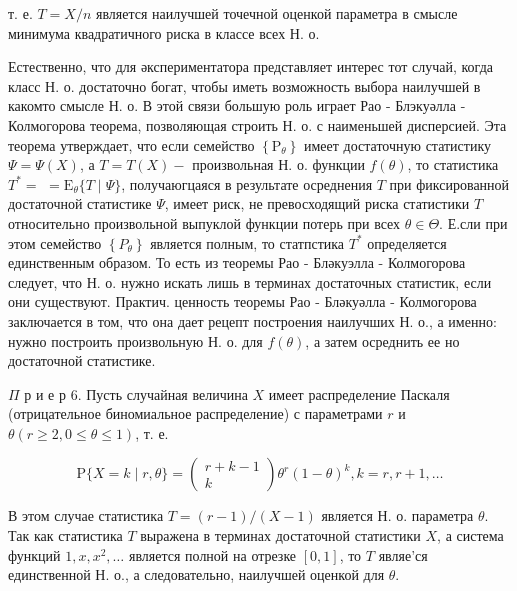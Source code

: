 \documentclass[10pt]{article}
\begin{document}
т. е. $T=X / n$ является наилучшей точечной оценкой параметра в смысле минимума квадратичного риска в классе всех Н. о.



Естественно, что для әкспериментатора представляет интерес тот случай, когда класс Н. о. достаточно богат, чтобы иметь возможность выбора наилучшей в какомто смысле Н. о. В этой связи большую роль играет Рао - Блэкуәлла - Колмогорова теорема, позволяющая строить Н. о. с наименьшей дисперсией. Эта теорема утверждает, что если семейство $\left\{\mathrm{P}_{\theta}\right\}$ имеет достаточную статистику $\Psi=\Psi(X)$, а $T=T(X)-$ произвольная Н. о. функции $f(\theta)$, то статистика $T^{*}=$ $=\mathrm{E}_{\theta}\{T \mid \Psi\}$, получаюгцаяся в результате осреднения $T$ при фиксированной достаточной статистике $\Psi$, имеет риск, не превосходящий риска статистики $T$ относительно произвольной выпуклой функции потерь при всех $\theta \in \Theta$. Е.сли при этом семейство $\left\{P_{\theta}\right\}$ является полным, то статпстика $T^{*}$ определяется единственным образом. То есть из теоремы Рао - Бләкуэлла - Колмогорова следует, что Н. о. нужно искать лишь в терминах достаточных статистик, если они существуют. Практич. ценность теоремы Рао - Бләкуәлла - Колмогорова заключается в том, что она дает рецепт построения наилучших Н. о., а именно: нужно построить произвольную Н. о. для $f(\theta)$, а затем осреднить ее но достаточной статистике.



$\Pi$ р и е р 6. Пусть случайная величина $X$ имеет распределение Паскаля (отрицательное биномиальное распределение) с параметрами $r$ и $\theta(r \geqslant 2,0 \leqslant \theta \leqslant 1)$, т. е.



\[

\mathrm{P}\{X=k \mid r, \theta\}=\left(\begin{array}{c}

r+k-1 \\

k

\end{array}\right) \theta^{r}(1-\theta)^{k}, k=r, r+1, \ldots

\]



В этом случае статистика $T=(r-1) /(X-1)$ является Н. о. параметра $\theta$. Так как статистика $T$ выражена в терминах достаточной статистики $X$, а система функций $1, x, x^{2}, \ldots$ является полной на отрезке $[0,1]$, то $T$ являе'ся единственной Н. о., а следовательно, наилучшей оценкой для $\theta$.
\end{document}
